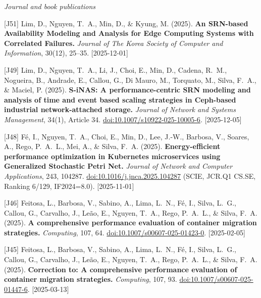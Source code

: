 {\textit{Journal and book publications}
\begin{pubenumerate}
\item {\color{blue}[J51]} Lim, D., Nguyen, T.\ A., Min, D., \& Kyung, M. (2025). 
  \textbf{An SRN-based Availability Modeling and Analysis for Edge Computing Systems with Correlated Failures.} 
  \textit{Journal of The Korea Society of Computer and Information}, 30(12), 25--35. [2025-12-01]

\item {\color{blue}[J49]} Lim, D., Nguyen, T.\ A., Li, J., Choi, E., Min, D., Cadena, R.\ M., Nogueira, B., Andrade, E., Callou, G., Di Mauro, M., Torquato, M., Silva, F.\ A., \& Maciel, P. (2025). 
  \textbf{S-iNAS: A performance-centric SRN modeling and analysis of time and event based scaling strategies in Ceph-based industrial network-attached storage.} 
  \textit{Journal of Network and Systems Management}, 34(1), Article 34. 
  \href{https://doi.org/10.1007/s10922-025-10005-6}{doi:10.1007/s10922-025-10005-6}. [2025-12-05]

\item {\color{blue}[J48]} F\'e, I., Nguyen, T.\ A., Choi, E., Min, D., Lee, J.-W., Barbosa, V., Soares, A., Rego, P.\ A.\ L., Mei, A., \& Silva, F.\ A. (2025). 
  \textbf{Energy-efficient performance optimization in Kubernetes microservices using Generalized Stochastic Petri Net.} 
  \textit{Journal of Network and Computer Applications}, 243, 104287. 
  \href{https://doi.org/10.1016/j.jnca.2025.104287}{doi:10.1016/j.jnca.2025.104287} (SCIE, JCR.Q1 CS.SE, Ranking 6/129,
IF2024=8.0). [2025-11-01]

\item {\color{blue}[J46]} Feitosa, L., Barbosa, V., Sabino, A., Lima, L.\ N., F\'e, I., Silva, L.\ G., Callou, G., Carvalho, J., Le\~ao, E., Nguyen, T.\ A., Rego, P.\ A.\ L., \& Silva, F.\ A. (2025). 
  \textbf{A comprehensive performance evaluation of container migration strategies.} 
  \textit{Computing}, 107, 64. 
  \href{https://doi.org/10.1007/s00607-025-01423-0}{doi:10.1007/s00607-025-01423-0}. [2025-02-05]

\item {\color{blue}[J45]} Feitosa, L., Barbosa, V., Sabino, A., Lima, L.\ N., F\'e, I., Silva, L.\ G., Callou, G., Carvalho, J., Le\~ao, E., Nguyen, T.\ A., Rego, P.\ A.\ L., \& Silva, F.\ A. (2025). 
  \textbf{Correction to: A comprehensive performance evaluation of container migration strategies.} 
  \textit{Computing}, 107, 93. 
  \href{https://doi.org/10.1007/s00607-025-01447-6}{doi:10.1007/s00607-025-01447-6}. [2025-03-13]


\end{pubenumerate}}
